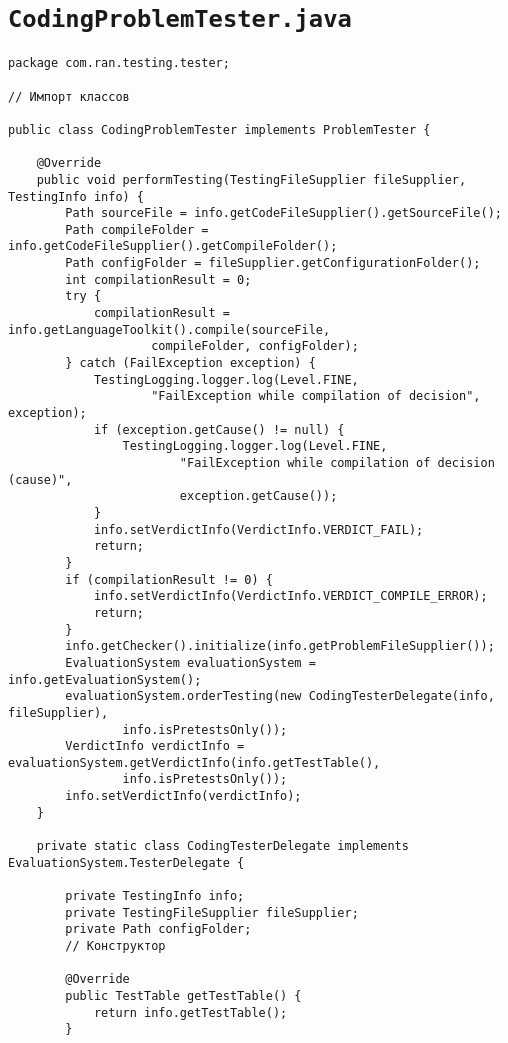 \section*{\texttt{CodingProblemTester.java}}
\begin{verbatim}
package com.ran.testing.tester;

// Импорт классов

public class CodingProblemTester implements ProblemTester {

    @Override
    public void performTesting(TestingFileSupplier fileSupplier, TestingInfo info) {
        Path sourceFile = info.getCodeFileSupplier().getSourceFile();
        Path compileFolder = info.getCodeFileSupplier().getCompileFolder();
        Path configFolder = fileSupplier.getConfigurationFolder();
        int compilationResult = 0;
        try {
            compilationResult = info.getLanguageToolkit().compile(sourceFile,
                    compileFolder, configFolder);
        } catch (FailException exception) {
            TestingLogging.logger.log(Level.FINE,
                    "FailException while compilation of decision", exception);
            if (exception.getCause() != null) {
                TestingLogging.logger.log(Level.FINE,
                        "FailException while compilation of decision (cause)",
                        exception.getCause());
            }
            info.setVerdictInfo(VerdictInfo.VERDICT_FAIL);
            return;
        }
        if (compilationResult != 0) {
            info.setVerdictInfo(VerdictInfo.VERDICT_COMPILE_ERROR);
            return;
        }
        info.getChecker().initialize(info.getProblemFileSupplier());
        EvaluationSystem evaluationSystem = info.getEvaluationSystem();
        evaluationSystem.orderTesting(new CodingTesterDelegate(info, fileSupplier),
                info.isPretestsOnly());
        VerdictInfo verdictInfo = evaluationSystem.getVerdictInfo(info.getTestTable(),
                info.isPretestsOnly());
        info.setVerdictInfo(verdictInfo);
    }
    
    private static class CodingTesterDelegate implements EvaluationSystem.TesterDelegate {

        private TestingInfo info;
        private TestingFileSupplier fileSupplier;
        private Path configFolder;
        // Конструктор
        
        @Override
        public TestTable getTestTable() {
            return info.getTestTable();
        }


\end{verbatim}
